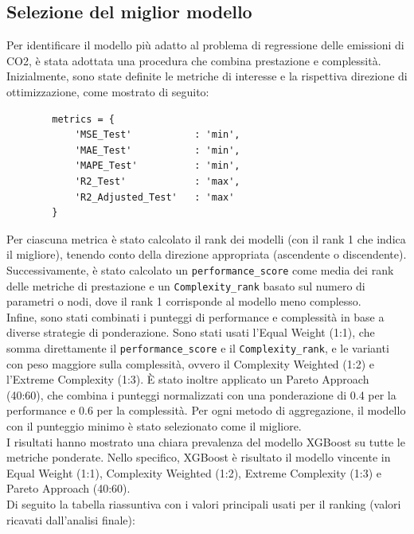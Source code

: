 \documentclass[a4paper,12pt]{report}
\begin{document}
	\subsection{Selezione del miglior modello}
	Per identificare il modello più adatto al problema di regressione delle emissioni di CO2, è stata adottata una procedura che combina prestazione e complessità. Inizialmente, sono state definite le metriche di interesse e la rispettiva direzione di ottimizzazione, come mostrato di seguito: \\
	
	\begin{verbatim}
		metrics = {
			'MSE_Test'           : 'min',
			'MAE_Test'           : 'min',
			'MAPE_Test'          : 'min',
			'R2_Test'            : 'max',
			'R2_Adjusted_Test'   : 'max'
		}
	\end{verbatim}
	
	Per ciascuna metrica è stato calcolato il rank dei modelli (con il rank 1 che indica il migliore), tenendo conto della direzione appropriata (ascendente o discendente). Successivamente, è stato calcolato un \texttt{performance\_score} come media dei rank delle metriche di prestazione e un \texttt{Complexity\_rank} basato sul numero di parametri o nodi, dove il rank 1 corrisponde al modello meno complesso. \\
	Infine, sono stati combinati i punteggi di performance e complessità in base a diverse strategie di ponderazione. Sono stati usati l'Equal Weight (1:1), che somma direttamente il \texttt{performance\_score} e il \texttt{Complexity\_rank}, e le varianti con peso maggiore sulla complessità, ovvero il Complexity Weighted (1:2) e l'Extreme Complexity (1:3). È stato inoltre applicato un Pareto Approach (40:60), che combina i punteggi normalizzati con una ponderazione di 0.4 per la performance e 0.6 per la complessità. Per ogni metodo di aggregazione, il modello con il punteggio minimo è stato selezionato come il migliore. \\
	I risultati hanno mostrato una chiara prevalenza del modello XGBoost su tutte le metriche ponderate. Nello specifico, XGBoost è risultato il modello vincente in Equal Weight (1:1), Complexity Weighted (1:2), Extreme Complexity (1:3) e Pareto Approach (40:60). \\
	Di seguito la tabella riassuntiva con i valori principali usati per il ranking (valori ricavati dall'analisi finale):
	
\end{document}
